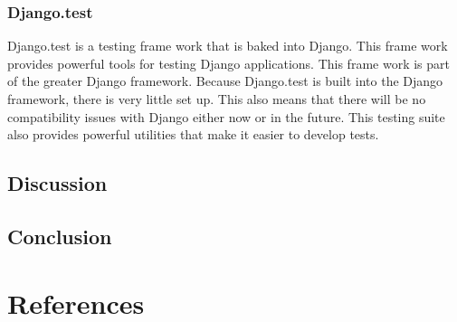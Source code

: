\documentclass[letterpaper,10pt]{article}
\begin{document}
		\subsubsection{Django.test}
			Django.test is a testing frame work that is baked into Django. This frame work provides powerful tools for testing Django applications. This frame work is part of the greater Django framework. Because Django.test is built into the Django framework, there is very little set up. This also means that there will be no compatibility issues with Django either now or in the future. This testing suite also provides powerful utilities that make it easier to develop tests. 
	\subsection{Discussion}
	
	\subsection{Conclusion}
	
\section{References}
\end{document}

